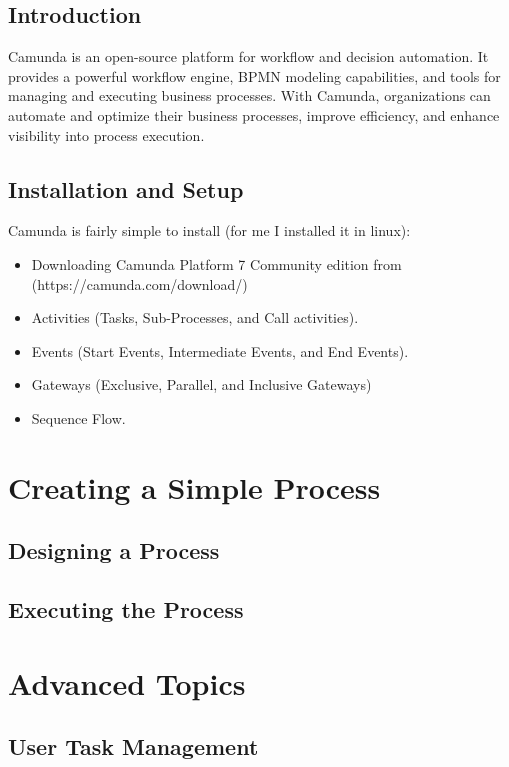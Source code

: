\documentclass[12pt]{article}
\begin{document}
{  \subsection{Introduction}

Camunda is an open-source platform for workflow and decision automation. It provides a powerful workflow engine, BPMN modeling capabilities, and tools for managing and executing business processes. With Camunda, organizations can automate and optimize their business processes, improve efficiency, and enhance visibility into process execution.

  \subsection{Installation and Setup}

Camunda is fairly simple to install (for me I installed it in linux):

  \begin{itemize}
    \item Downloading Camunda Platform 7 Community edition from (https://camunda.com/download/)
    \item Activities (Tasks, Sub-Processes, and Call activities).
    \item Events (Start Events, Intermediate Events, and End Events).
    \item Gateways (Exclusive, Parallel, and Inclusive Gateways)
    \item Sequence Flow.
  \end{itemize}

\pagebreak

\section{Creating a Simple Process}
  \subsection{Designing a Process}
  \subsection{Executing the Process}

\pagebreak

\section{Advanced Topics}
  \subsection{User Task Management}
}
\end{document}
